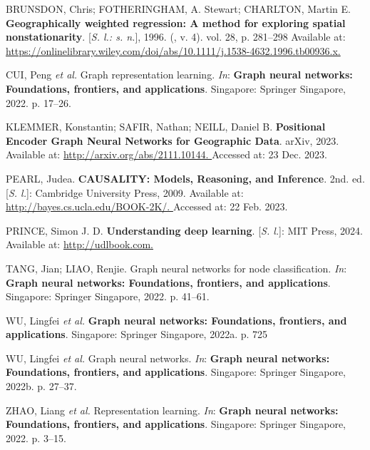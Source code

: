\documentclass[12pt, a4paper, twoside]{article}
\numberwithin{equation}{subsection} %
\newlength{\cslhangindent}
\newlength{\cslentryspacingunit} %
\newenvironment{CSLReferences}[2] %
 {%
  \setlength{\parindent}{0pt}
  \ifodd #1
  \let\oldpar\par
  \def\par{\hangindent=\cslhangindent\oldpar}
  \fi
  \setlength{\parskip}{#2\cslentryspacingunit}
 }%
 {}
\begin{document}
\label{refs}
\begin{CSLReferences}{0}{1}
BRUNSDON, Chris; FOTHERINGHAM, A. Stewart; CHARLTON, Martin E.
\textbf{Geographically weighted regression: A method for exploring
spatial nonstationarity}. {[}\emph{S. l.: s. n.}{]}, 1996. (, v. 4).
vol. 28, p. 281--298 Available at:
\href{https://onlinelibrary.wiley.com/doi/abs/10.1111/j.1538-4632.1996.tb00936.x}{https://onlinelibrary.wiley.com/doi/abs/10.1111/j.1538-4632.1996.tb00936.x.
}

CUI, Peng \emph{et al.} Graph representation learning. \emph{In}:
\textbf{Graph neural networks: Foundations, frontiers, and
applications}. Singapore: Springer Singapore, 2022. p. 17--26.

KLEMMER, Konstantin; SAFIR, Nathan; NEILL, Daniel B. \textbf{Positional
{Encoder} {Graph} {Neural} {Networks} for {Geographic} {Data}}. arXiv,
2023. Available at:
\href{http://arxiv.org/abs/2111.10144}{http://arxiv.org/abs/2111.10144.
}Accessed at: 23 Dec. 2023.

PEARL, Judea. \textbf{{CAUSALITY}: {Models}, {Reasoning}, and
{Inference}}. 2nd. ed. {[}\emph{S. l.}{]}: Cambridge University Press,
2009. Available at:
\href{http://bayes.cs.ucla.edu/BOOK-2K/}{http://bayes.cs.ucla.edu/BOOK-2K/.
}Accessed at: 22 Feb. 2023.

PRINCE, Simon J. D. \textbf{Understanding deep learning}. {[}\emph{S.
l.}{]}: MIT Press, 2024. Available at:
\href{http://udlbook.com}{http://udlbook.com. }

TANG, Jian; LIAO, Renjie. Graph neural networks for node classification.
\emph{In}: \textbf{Graph neural networks: Foundations, frontiers, and
applications}. Singapore: Springer Singapore, 2022. p. 41--61.

WU, Lingfei \emph{et al.} \textbf{Graph neural networks: Foundations,
frontiers, and applications}. Singapore: Springer Singapore, 2022a. p.
725

WU, Lingfei \emph{et al.} Graph neural networks. \emph{In}:
\textbf{Graph neural networks: Foundations, frontiers, and
applications}. Singapore: Springer Singapore, 2022b. p. 27--37.

ZHAO, Liang \emph{et al.} Representation learning. \emph{In}:
\textbf{Graph neural networks: Foundations, frontiers, and
applications}. Singapore: Springer Singapore, 2022. p. 3--15.

\end{CSLReferences}







\end{document}
